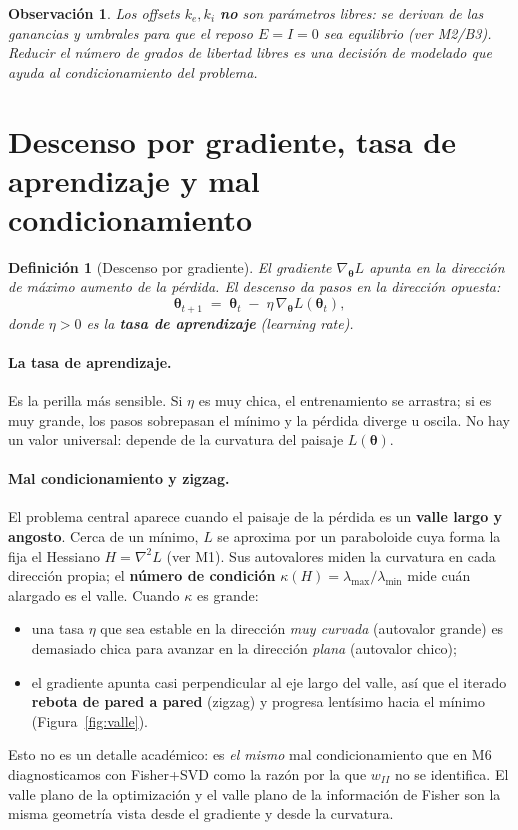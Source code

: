 \documentclass[11pt,a4paper]{article}
\newtheorem{definition}{Definición}
\newtheorem{remark}{Observación}
\newcommand{\thetavec}{\bm{\theta}}
\begin{document}
\begin{remark}
Los offsets $k_e,k_i$ \textbf{no} son parámetros libres: se derivan de las ganancias y umbrales para que el reposo $E=I=0$ sea equilibrio (ver M2/B3). Reducir el número de grados de libertad libres es una decisión de modelado que ayuda al condicionamiento del problema.
\end{remark}

\section{Descenso por gradiente, tasa de aprendizaje y mal condicionamiento}
\label{sec:gd}

\begin{definition}[Descenso por gradiente]
El gradiente $\nabla_{\thetavec} L$ apunta en la dirección de \emph{máximo aumento} de la pérdida. El descenso da pasos en la dirección opuesta:
$$
\thetavec_{t+1} \;=\; \thetavec_{t} \;-\; \eta\,\nabla_{\thetavec} L(\thetavec_{t}),
$$
donde $\eta>0$ es la \textbf{tasa de aprendizaje} (\emph{learning rate}).
\end{definition}

\paragraph{La tasa de aprendizaje.} Es la perilla más sensible. Si $\eta$ es muy chica, el entrenamiento se arrastra; si es muy grande, los pasos sobrepasan el mínimo y la pérdida diverge u oscila. No hay un valor universal: depende de la curvatura del paisaje $L(\thetavec)$.

\paragraph{Mal condicionamiento y zigzag.} El problema central aparece cuando el paisaje de la pérdida es un \textbf{valle largo y angosto}. Cerca de un mínimo, $L$ se aproxima por un paraboloide cuya forma la fija el Hessiano $H=\nabla^2 L$ (ver M1). Sus autovalores miden la curvatura en cada dirección propia; el \textbf{número de condición} $\kappa(H)=\lambda_{\max}/\lambda_{\min}$ mide cuán alargado es el valle. Cuando $\kappa$ es grande:
\begin{itemize}[nosep]
  \item una tasa $\eta$ que sea estable en la dirección \emph{muy curvada} (autovalor grande) es demasiado chica para avanzar en la dirección \emph{plana} (autovalor chico);
  \item el gradiente apunta casi perpendicular al eje largo del valle, así que el iterado \textbf{rebota de pared a pared} (zigzag) y progresa lentísimo hacia el mínimo (Figura~\ref{fig:valle}).
\end{itemize}
Esto no es un detalle académico: es \emph{el mismo} mal condicionamiento que en M6 diagnosticamos con Fisher+SVD como la razón por la que $w_{II}$ no se identifica. El valle plano de la optimización y el valle plano de la información de Fisher son la misma geometría vista desde el gradiente y desde la curvatura.
\end{document}
